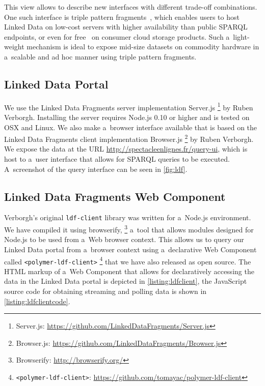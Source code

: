 \documentclass[runningheads,a4paper]{llncs}
\begin{document}
This view allows to describe new interfaces with different trade-off combinations.
One such interface is triple pattern fragments~\cite{verborgh2014triplepatterns},
which enables users to host Linked Data on low-cost servers with higher availability
than public SPARQL endpoints, or even for free~\cite{matteis2014ldf}
on consumer cloud storage products.
Such a~light-weight mechanism is ideal to expose mid-size datasets on commodity hardware
in a~scalable and ad hoc manner using triple pattern fragments.

\subsection{Linked Data Portal}

We use the Linked Data Fragments server implementation Server.js%
\footnote{Server.js: \url{https://github.com/LinkedDataFragments/Server.js}} by Ruben Verborgh.
Installing the server requires Node.js 0.10 or higher and is tested on OSX and Linux.
We also make a~browser interface available that is based on the Linked Data Fragments
client implementation Browser.js%
\footnote{Browser.js: \url{https://github.com/LinkedDataFragments/Browser.js}} by Ruben Verborgh.
We expose the data at the URL \url{http://spectacleenlignes.fr/query-ui},
which is host to a~user interface that allows for SPARQL queries to be executed.
A~screenshot of the query interface can be seen in \autoref{fig:ldf}.

\subsection{Linked Data Fragments Web Component}

Verborgh's original \texttt{ldf-client} library was written for a~Node.js environment.
We have compiled it using browserify,%
\footnote{Browserify: \url{http://browserify.org/}}
a~tool that allows modules designed for Node.js to be used from a~Web browser context.
This allows us to query our Linked Data portal from a~browser context using a~declarative Web Component
called \texttt{<polymer-ldf-client>}%
\footnote{\texttt{<polymer-ldf-client>}:
\url{https://github.com/tomayac/polymer-ldf-client}}
that we have also released as open source.
The HTML markup of a~Web Component that allows for declaratively accessing the data in the Linked Data portal is depicted in \autoref{listing:ldfclient},
the JavaScript source code for obtaining streaming and polling data
is shown in \autoref{listing:ldfclientcode}.
\end{document}
